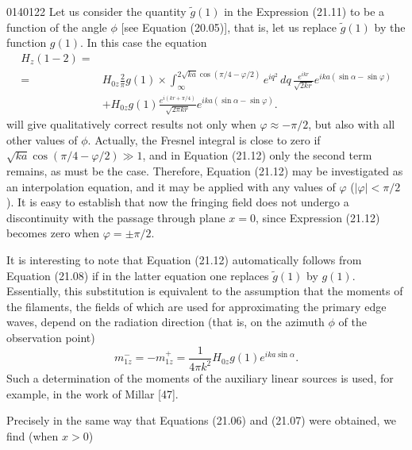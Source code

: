 \begin{scanpage}{0140}{122}
Let us consider the quantity $\widetilde g(1)$ in the Expression (21.11) to be a function of the angle $\phi$ [see Equation (20.05)], that is, let us replace $\widetilde g(1)$ by the function $g(1)$. In this case the equation
\[
\begin{aligned}
H_z(1-2)={}&\\
={}&H_{0z}\frac2\pi g(1)\times\int_\infty^{2\sqrt{ka}\cos(\pi/4-\varphi/2)}e^{iq^2}\,dq\,\frac{e^{ikr}}{\sqrt{2kr}}e^{ika(\sin\alpha-\sin\varphi)}\\
&+H_{0z}g(1)\frac{e^{i(kr+\pi/4)}}{\sqrt{2\pi kr}}e^{ika(\sin\alpha-\sin\varphi)}.
\end{aligned}\tag{21.12}
\]
will give qualitatively correct results not only when $\varphi\approx-\pi/2$, but also with all other values of $\phi$. Actually, the Fresnel integral is close to zero if $\sqrt{ka}\cos(\pi/4-\varphi/2)\gg1$, and in Equation (21.12) only the second term remains, as must be the case. Therefore, Equation (21.12) may be investigated as an interpolation equation, and it may be applied with any values of $\varphi$ ($|\varphi|<\pi/2$). It is easy to establish that now the fringing field does not undergo a discontinuity with the passage through plane $x=0$, since Expression (21.12) becomes zero when $\varphi=\pm\pi/2$.

It is interesting to note that Equation (21.12) automatically follows from Equation (21.08) if in the latter equation one replaces $\widetilde g(1)$ by $g(1)$. Essentially, this substitution is equivalent to the assumption that the moments of the filaments, the fields of which are used for approximating the primary edge waves, depend on the radiation direction (that is, on the azimuth $\phi$ of the observation point)
\[
m_{1z}^-=-m_{1z}^+=\frac1{4\pi k^2}H_{0z}g(1)e^{ika\sin\alpha}.\tag{21.13}
\]
Such a determination of the moments of the auxiliary linear sources is used, for example, in the work of Millar [47].

Precisely in the same way that Equations (21.06) and (21.07) were obtained, we find (when $x>0$)
\end{scanpage}
